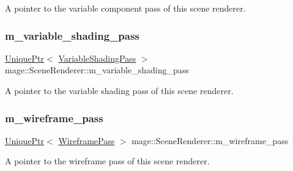 A pointer to the variable component pass of this scene renderer. \hypertarget{classmage_1_1_scene_renderer_a9ee6d267f8cfb7826c16acd4fe0b7852}{}\label{classmage_1_1_scene_renderer_a9ee6d267f8cfb7826c16acd4fe0b7852} 
\subsubsection{\texorpdfstring{m\+\_\+variable\+\_\+shading\+\_\+pass}{m\_variable\_shading\_pass}}
{\footnotesize\ttfamily \hyperlink{namespacemage_a3316d7143a973e37adf1110f2e80ca31}{Unique\+Ptr}$<$ \hyperlink{classmage_1_1_variable_shading_pass}{Variable\+Shading\+Pass} $>$ mage\+::\+Scene\+Renderer\+::m\+\_\+variable\+\_\+shading\+\_\+pass\hspace{0.3cm}{\ttfamily [private]}}

A pointer to the variable shading pass of this scene renderer. \hypertarget{classmage_1_1_scene_renderer_a3f84786f9ed001345c746292cb08ad2f}{}\label{classmage_1_1_scene_renderer_a3f84786f9ed001345c746292cb08ad2f} 
\subsubsection{\texorpdfstring{m\+\_\+wireframe\+\_\+pass}{m\_wireframe\_pass}}
{\footnotesize\ttfamily \hyperlink{namespacemage_a3316d7143a973e37adf1110f2e80ca31}{Unique\+Ptr}$<$ \hyperlink{classmage_1_1_wireframe_pass}{Wireframe\+Pass} $>$ mage\+::\+Scene\+Renderer\+::m\+\_\+wireframe\+\_\+pass\hspace{0.3cm}{\ttfamily [private]}}

A pointer to the wireframe pass of this scene renderer. 